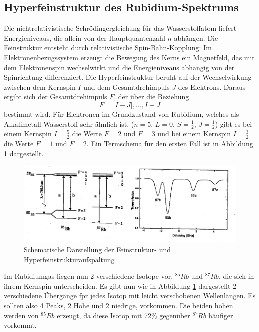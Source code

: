 \subsection{Hyperfeinstruktur des Rubidium-Spektrums}
Die nichtrelativistische Schrödingergleichung für das Wasserstoffatom liefert Energieniveaus, die allein von der Hauptquantenzahl \(n\) abhängen. Die Feinstruktur entsteht durch relativistische Spin-Bahn-Kopplung: 
Im Elektronenbezugssystem erzeugt die Bewegung des Kerns ein Magnetfeld, das mit dem Elektronenspin wechselwirkt und die Energieniveaus abhängig von der Spinrichtung differenziert.
Die Hyperfeinstruktur beruht auf der Wechselwirkung zwischen dem Kernspin \(I\) und dem Gesamtdrehimpuls \(J\) des Elektrons. Daraus ergibt sich der Gesamtdrehimpuls \(F\), der über die Beziehung 
\[
F = |I - J|, ..., I + J
\]
bestimmt wird. Für Elektronen im Grundzustand von Rubidium, welches als Alkalimetall Wasserstoff sehr ähnlich ist, (\(n=5\), \(L=0\), \(S=\frac{1}{2}\), \(J=\frac{1}{2}\)) gibt es bei einem Kernspin \(I=\frac{5}{2}\) die Werte \(F=2\) und \(F=3\)
und bei einem Kernspin \(I=\frac{3}{2}\) die Werte \(F=1\) und \(F=2\). Ein Termschema für den ersten Fall ist in Abbildung \ref{fig:Feinstruktur} dargestellt.
\begin{figure}
    \centering
    \includegraphics[scale=1.1]{pictures/Term.png}
    \caption{Schematische Darstellung der Feinstruktur- und Hyperfeinstrukturaufspaltung}
    \label{fig:Feinstruktur}
\end{figure}
Im Rubidiumgas liegen nun 2 verschiedene Isotope vor, \(^{85}Rb\) und \(^{87}Rb\), die sich in ihrem Kernspin unterscheiden. Es gibt nun wie in 
Abbildung \ref{fig:Feinstruktur} dargestellt 2 verschiedene Übergänge fpr jedes Isotop mit leicht verschobenen Wellenlängen. Es sollten also 4 Peaks, 2 Hohe und 2 niedrige, vorkommen.
Die beiden hohen werden von \(^{85}Rb\) erzeugt, da diese Isotop mit 72\% gegenüber \(^{87}Rb\) häufiger vorkommt. 
